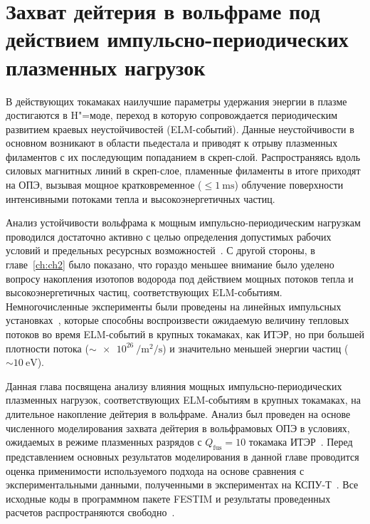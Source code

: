 \chapter{Захват дейтерия в вольфраме под действием импульсно-периодических плазменных нагрузок}\label{ch:ch3}

В действующих токамаках наилучшие параметры удержания энергии в плазме достигаются в H"=моде, переход в которую сопровождается периодическим развитием краевых неустойчивостей (ELM-событий). Данные неустойчивости в основном возникают в области пьедестала и приводят к отрыву плазменных филаментов с их последующим попаданием в скреп-слой. Распространяясь вдоль силовых магнитных линий в скреп-слое, пламенные филаменты в итоге приходят на ОПЭ, вызывая мощное кратковременное (\( \leq \SI{1}{\milli\second} \)) облучение поверхности интенсивными потоками тепла и высокоэнергетичных частиц.

Анализ устойчивости вольфрама к мощным импульсно-периодическим нагрузкам проводился достаточно активно с целью определения допустимых рабочих условий и предельных ресурсных возможностей~\cite{Pintsuk2012,Budaev2015,Rieth2019}. С другой стороны, в главе~\cref{ch:ch2} было показано, что гораздо меньшее внимание было уделено вопросу накопления изотопов водорода под действием мощных потоков тепла и высокоэнергетичных частиц, соответствующих ELM-событиям. Немногочисленные эксперименты были проведены на линейных импульсных установках~\cite{Poskakalov2020,Ogorodnikova,Nishijima2011}, которые способны воспроизвести ожидаемую величину тепловых потоков во время ELM-событий в крупных токамаках, как ИТЭР, но при большей плотности потока (\(\sim\SI{e26}{\per\meter\squared\per\second}\)) и значительно меньшей энергии частиц (\(\sim\SI{10}{\electronvolt}\)). 

Данная глава посвящена анализу влияния мощных импульсно-периодических плазменных нагрузок, соответствующих ELM-событиям в крупных токамаках, на длительное накопление дейтерия в вольфраме. Анализ был проведен на основе численного моделирования захвата дейтерия в вольфрамовых ОПЭ в условиях, ожидаемых в режиме плазменных разрядов с \(Q_\mathrm{fus}=\num{10}\) токамака ИТЭР~\cite{Kulagin2025_JNM}. Перед представлением основных результатов моделирования в данной главе проводится оценка применимости используемого подхода на основе сравнения с экспериментальными данными, полученными в экспериментах на КСПУ-Т~\cite{Poskakalov2020}. Все исходные коды в программном пакете FESTIM и результаты проведенных расчетов распространяются свободно~\cite{Kulagin_PhD_2025}.

